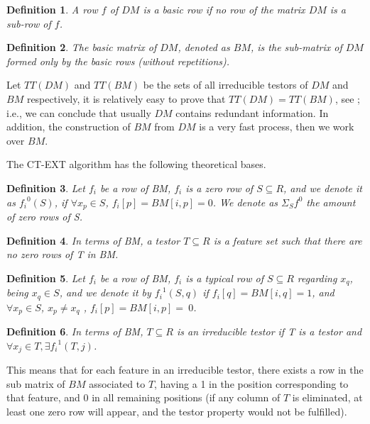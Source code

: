 \documentclass[authoryear,preprint,review,12pt]{elsarticle}
\newtheorem{definition}{Definition}
\begin{document}
\begin{definition}
A row $f$ of $DM$ is a basic row if no row of the matrix $DM$ is a sub-row of $f$. 
\end{definition}

\begin{definition}
The basic matrix of $DM$, denoted as $BM$, is the sub-matrix of $DM$ formed only by the basic rows (without 
repetitions).

\end{definition}

Let $TT(DM)$ and $TT(BM)$ be the sets of all irreducible testors of $DM$ and $BM$ respectively, it is 
relatively easy to prove that $TT(DM)=TT(BM)$, see \citep{R32}; i.e., we can conclude that usually $DM$ 
contains redundant information. In addition, the construction of $BM$ from $DM$ is a very fast process, 
then we work over $BM$.

The CT-EXT algorithm has the following theoretical bases.
\begin{definition} \label{def21} Let $f_i$ be a row of BM, $f_i$ is a zero row of $S \subseteq R$, and we denote it as ${f_i}^0 (S)$, if $\forall x_p \in S$, $f_i [p] = BM [i, p] = 0$. We denote as $\Sigma_S f^0$  the amount of zero rows of S.
\end{definition}
\begin{definition} \label{def22} In terms of BM, a testor $T \subseteq R$ is a feature set such that there
are no zero rows of T in BM. 
\end{definition}
\begin{definition} \label{def23} Let $f_i$ be a row of BM, $f_i$ is a typical row of $S \subseteq R$ regarding $x_q$, being $x_q \in S$, and we denote it by ${f_i}^1 (S,q)$ if $f_i [q] = BM [i, q] = 1$, and $\forall x_p \in S$, $x_p \neq x_q$ , $f_i [p] = BM [i, p] =~0$.
\end{definition}

\begin{definition} \label{def24} In terms of BM, $T \subseteq R$ is an irreducible testor if T is a testor and
$\forall x_j \in T, \exists {f_i}^1 (T, j)$.
\end{definition}

This means that for each feature in an irreducible testor, there exists a row in 
the sub matrix of $BM$ associated to $T$, having a 1 in the position corresponding
to that feature, and 0 in all remaining positions (if any column of $T$ is eliminated, 
at least one zero row will appear, and the testor property would not be fulfilled). 
\end{document}
